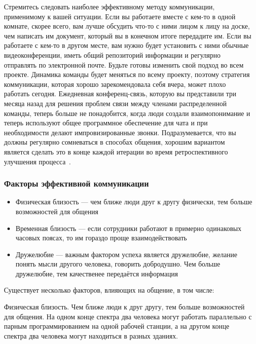\documentclass{../industrial-development}
\begin{document}
\lecturenotes

Стремитесь следовать наиболее эффективному методу коммуникации, применимому к вашей ситуации. Если вы работаете вместе с кем-то в одной комнате, скорее всего, вам лучше обсудить что-то с ними лицом к лицу на доске, чем написать им документ, который вы в конечном итоге передадите им. Если вы работаете с кем-то в другом месте, вам нужно будет установить с ними обычные видеоконференции, иметь общий репозиторий информации и регулярно отправлять по электронной почте.
Будьте готовы изменить свой подход во всем проекте. Динамика команды будет меняться по всему проекту, поэтому стратегия коммуникации, которая хорошо зарекомендовала себя вчера, может плохо работать сегодня. Ежедневная конференц-связь, которую вы представили три месяца назад для решения проблем связи между членами распределенной команды, теперь больше не понадобится, когда люди создали взаимопонимание и теперь используют общее программное обеспечение для чата и при необходимости делают импровизированные звонки. Подразумевается, что вы должны регулярно сомневаться в способах общения, хорошим вариантом является сделать это в конце каждой итерации во время ретроспективного улучшения процесса~\cite{AgileComm}.

\begin{frame} \frametitle{Факторы эффективной коммуникации}
  \begin{itemize}
  \item Физическая близость --- чем ближе люди друг к другу физически, тем больше возможностей для общения
  \item Временная близость --- если сотрудники работают в примерно одинаковых часовых поясах, то им гораздо проще взаимодействовать
  \item Дружелюбие --- важным фактором успеха является дружелюбие, желание понять мысли другого человека, говорить добродушно. Чем больше дружелюбие, тем качественее передаётся информация
  \end{itemize}
\end{frame}

\lecturenotes

Существует несколько факторов, влияющих на общение, в том числе:

Физическая близость. Чем ближе люди к друг другу, тем больше возможностей для общения. На одном конце спектра два человека могут работать параллельно с парным программированием на одной рабочей станции, а на другом конце спектра два человека могут находиться в разных зданиях.
\end{document}
